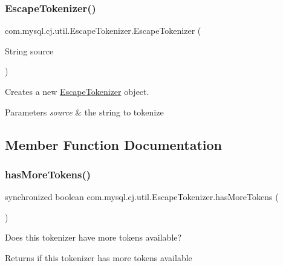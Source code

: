 \subsubsection{\texorpdfstring{Escape\+Tokenizer()}{EscapeTokenizer()}}
{\footnotesize\ttfamily com.\+mysql.\+cj.\+util.\+Escape\+Tokenizer.\+Escape\+Tokenizer (\begin{DoxyParamCaption}\item[{String}]{source }\end{DoxyParamCaption})}

Creates a new \mbox{\hyperlink{classcom_1_1mysql_1_1cj_1_1util_1_1_escape_tokenizer}{Escape\+Tokenizer}} object.


\begin{DoxyParams}{Parameters}
{\em source} & the string to tokenize \\
\hline
\end{DoxyParams}


\subsection{Member Function Documentation}
\mbox{\label{classcom_1_1mysql_1_1cj_1_1util_1_1_escape_tokenizer_a3a4646a7210f61efc6447864bd3480ca}} 
\subsubsection{\texorpdfstring{has\+More\+Tokens()}{hasMoreTokens()}}
{\footnotesize\ttfamily synchronized boolean com.\+mysql.\+cj.\+util.\+Escape\+Tokenizer.\+has\+More\+Tokens (\begin{DoxyParamCaption}{ }\end{DoxyParamCaption})}

Does this tokenizer have more tokens available?

\begin{DoxyReturn}{Returns}
if this tokenizer has more tokens available 
\end{DoxyReturn}
\mbox{\label{classcom_1_1mysql_1_1cj_1_1util_1_1_escape_tokenizer_a7a5f75e02ae63689a4c0d7a7f348b57d}} 
